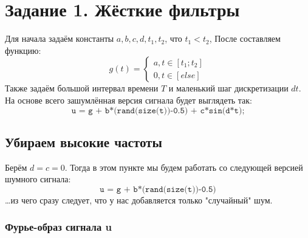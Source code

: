 \chapter{Задание 1. Жёсткие фильтры}
\label{ch:chap2}


\lstset{style=mystyle}



Для начала задаём константы $a, b, c, d, t_1, t_2$, что $t_1 < t_2$, После составляем функцию:
$$
g(t) = \begin{cases}
        a, t\in[t_1 ; t_2] \\
        0, t\in[else]
       \end{cases}
$$
Также задаём большой интервал времени $T$ и маленький шаг дискретизации $dt$. На основе всего зашумлённая версия сигнала будет выглядеть так:
$$
\texttt{u = g + b*(rand(size(t))-0.5) + c*sin(d*t);}
$$

\section{Убираем высокие частоты}

Берём $d=c=0$. Тогда в этом пункте мы будем работать со следующей версией шумного сигнала:
$$
\texttt{u = g + b*(rand(size(t))-0.5)}
$$\dots из чего сразу следует, что у нас добавляется только "случайный" шум.

\newpage
\subsection{Фурье-образ сигнала u}

